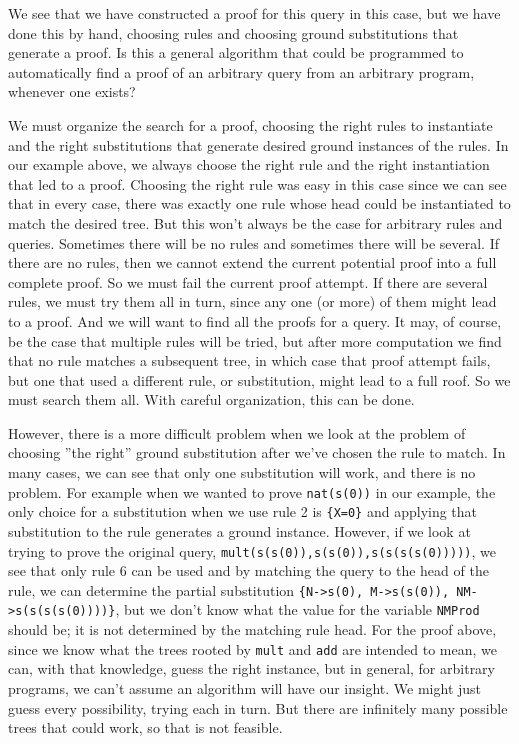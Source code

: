 We see that we have constructed a proof for this query in this case,
but we have done this by hand, choosing rules and choosing ground
substitutions that generate a proof.  Is this a general algorithm that
could be programmed to automatically find a proof of an arbitrary
query from an arbitrary program, whenever one exists?

We must organize the search for a proof, choosing the right rules to
instantiate and the right substitutions that generate desired ground
instances of the rules.  In our example above, we always choose the
right rule and the right instantiation that led to a proof.  Choosing
the right rule was easy in this case since we can see that in every
case, there was exactly one rule whose head could be instantiated to
match the desired tree.  But this won't always be the case for
arbitrary rules and queries.  Sometimes there will be no rules and
sometimes there will be several.  If there are no rules, then we
cannot extend the current potential proof into a full complete proof.
So we must fail the current proof attempt.  If there are several
rules, we must try them all in turn, since any one (or more) of them
might lead to a proof.  And we will want to find all the proofs for a
query.  It may, of course, be the case that multiple rules will be
tried, but after more computation we find that no rule matches a
subsequent tree, in which case that proof attempt fails, but one that
used a different rule, or substitution, might lead to a full roof.  So
we must search them all.  With careful organization, this can be done.

However, there is a more difficult problem when we look at the problem
of choosing ''the right'' ground substitution after we've chosen the
rule to match.  In many cases, we can see that only one substitution
will work, and there is no problem.  For example when we wanted to
prove \verb|nat(s(0))| in our example, the only choice for a
substitution when we use rule 2 is \verb|{X=0}| and applying that
substitution to the rule generates a ground instance.  However, if we
look at trying to prove the original query,
\verb|mult(s(s(0)),s(s(0)),s(s(s(s(0)))))|, we see that only rule 6
can be used and by matching the query to the head of the rule, we can
determine the partial substitution
\verb|{N->s(0), M->s(s(0)), NM->s(s(s(s(0))))}|, but we don't know
what the value for the variable \verb|NMProd| should be; it is not
determined by the matching rule head.  For the proof above, since we
know what the trees rooted by \verb|mult| and \verb|add| are intended
to mean, we can, with that knowledge, guess the right instance, but in
general, for arbitrary programs, we can't assume an algorithm will
have our insight.  We might just guess every possibility, trying each
in turn.  But there are infinitely many possible trees that could
work, so that is not feasible.

